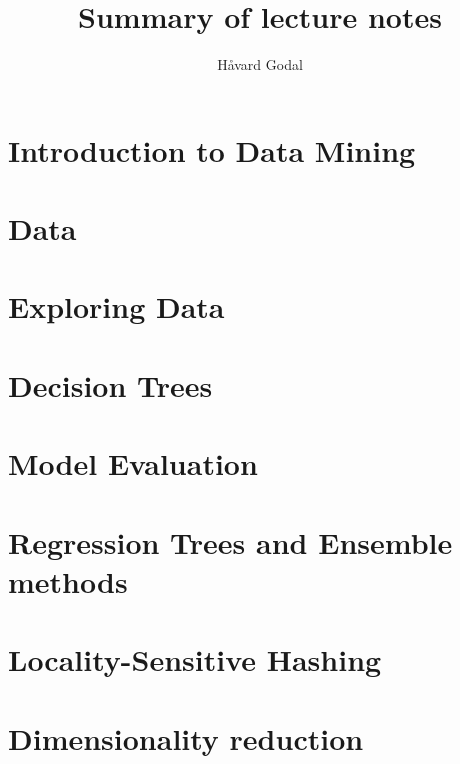 \documentclass{notesclass}
\begin{document}
\begin{titlepage}
    \title{Summary of lecture notes}
    \author{Håvard Godal}
    \maketitle
\end{titlepage}

{
  \hypersetup{linkcolor=black}
  \tableofcontents
}


\chapter{Introduction to Data Mining}


\chapter{Data}


\chapter{Exploring Data}


\chapter{Decision Trees}


\chapter{Model Evaluation}


\chapter{Regression Trees and Ensemble methods}


\chapter{Locality-Sensitive Hashing}


\chapter{Dimensionality reduction}

\end{document}
